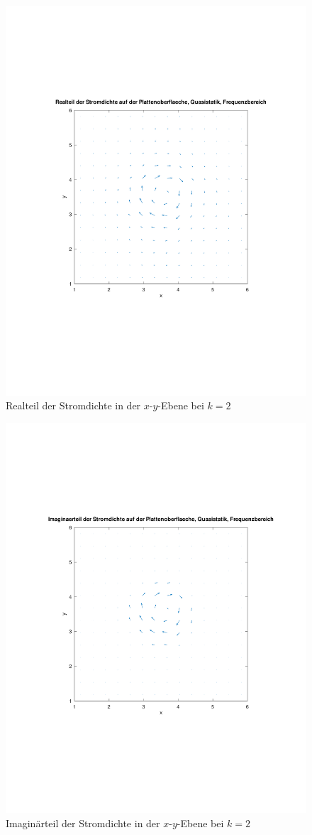 \documentclass[Protokollheft.tex]{subfiles}
\begin{document}
\begin{figure}[h]
	\centering
	\includegraphics[trim = 15mm 65mm 15mm 65mm, clip,width=0.7\linewidth]{Stromdichte_real.pdf}
	\caption{Realteil der Stromdichte in der $x$-$y$-Ebene bei $k=2$}
	\label{fig:Stromdichte_real}
\end{figure}

\begin{figure}[h]
	\centering
	\includegraphics[trim = 15mm 65mm 15mm 65mm, clip,width=0.7\linewidth]{Stromdichte_ima.pdf}
	\caption{Imaginärteil der Stromdichte in der $x$-$y$-Ebene bei $k=2$}
	\label{fig:Stromdichte_ima}
\end{figure}
\end{document}
